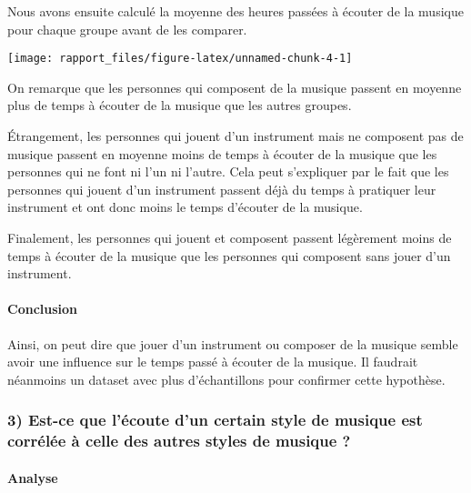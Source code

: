 \documentclass[
]{article}
\begin{document}
Nous avons ensuite calculé la moyenne des heures passées à écouter de la
musique pour chaque groupe avant de les comparer.

\begin{center}\texttt{[image: rapport\_files/figure-latex/unnamed-chunk-4-1]} \end{center}

On remarque que les personnes qui composent de la musique passent en
moyenne plus de temps à écouter de la musique que les autres groupes.

Étrangement, les personnes qui jouent d'un instrument mais ne composent
pas de musique passent en moyenne moins de temps à écouter de la musique
que les personnes qui ne font ni l'un ni l'autre. Cela peut s'expliquer
par le fait que les personnes qui jouent d'un instrument passent déjà du
temps à pratiquer leur instrument et ont donc moins le temps d'écouter
de la musique.

Finalement, les personnes qui jouent et composent passent légèrement
moins de temps à écouter de la musique que les personnes qui composent
sans jouer d'un instrument.

\hypertarget{conclusion-1}{%
\paragraph{\texorpdfstring{\textbf{Conclusion}}{Conclusion}}\label{conclusion-1}}

Ainsi, on peut dire que jouer d'un instrument ou composer de la musique
semble avoir une influence sur le temps passé à écouter de la musique.
Il faudrait néanmoins un dataset avec plus d'échantillons pour confirmer
cette hypothèse.

\hypertarget{est-ce-que-luxe9coute-dun-certain-style-de-musique-est-corruxe9luxe9e-uxe0-celle-des-autres-styles-de-musique}{%
\subsubsection{3) Est-ce que l'écoute d'un certain style de musique est
corrélée à celle des autres styles de musique
?}\label{est-ce-que-luxe9coute-dun-certain-style-de-musique-est-corruxe9luxe9e-uxe0-celle-des-autres-styles-de-musique}}

\hypertarget{analyse-3}{%
\paragraph{\texorpdfstring{\textbf{Analyse}}{Analyse}}\label{analyse-3}}
\end{document}
